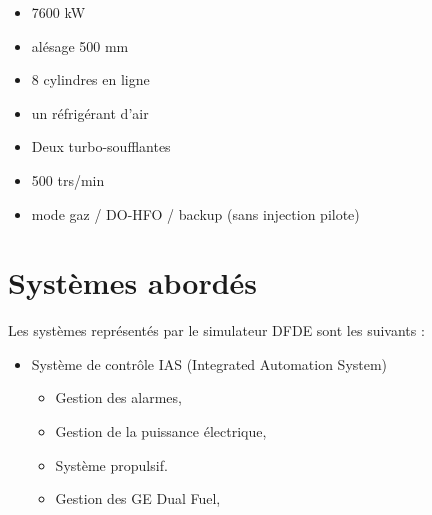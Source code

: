\documentclass[12pt,a4paper]{article}
\begin{document}
\begin{itemize}
 \item 7600 kW
 \item alésage 500 mm
 \item 8 cylindres en ligne
 \item un réfrigérant d'air
 \item Deux turbo-soufflantes
 \item 500 trs/min
 \item mode gaz / DO-HFO / backup (sans injection pilote)
\end{itemize}
%
%
%  

\section{Systèmes abordés }

 Les systèmes représentés par le simulateur DFDE sont les suivants :
 
 \begin{itemize}
  \item Système de contrôle IAS (Integrated Automation System)
  \begin{itemize}
        \item Gestion des alarmes,
        \item Gestion de la puissance électrique,
        \item Système propulsif.
        \item Gestion des GE Dual Fuel,
  \end{itemize}
  \end{itemize}
    
\end{document}
